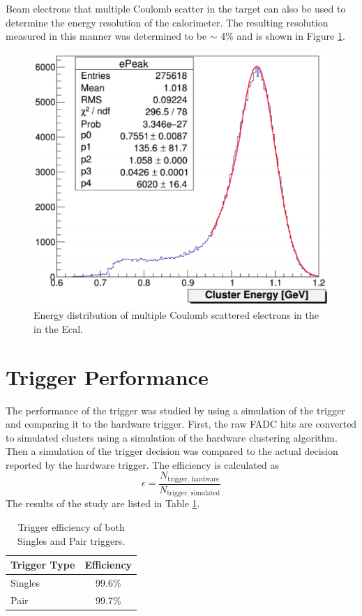 Beam electrons that multiple Coulomb scatter in the target can also be used to 
determine the energy resolution of the calorimeter.  The resulting resolution 
measured in this manner was determined to be $\sim$ 4\% and is shown in Figure
\ref{fig:energy_res}.
\begin{figure}[h!t]
    \centering
    \includegraphics[width=.7\textwidth]{images/ecal_energy_resolution.png}
    \caption{Energy distribution of multiple Coulomb scattered electrons in the
             in the Ecal.}
    \label{fig:energy_res}
\end{figure} 

\section{Trigger Performance}

The performance of the trigger was studied by using a simulation of the trigger
and comparing it to the hardware trigger.  First, the raw FADC hits are converted
to simulated clusters using a simulation of the hardware clustering algorithm. Then
a simulation of the trigger decision was compared to the actual decision reported
by the hardware trigger.  The efficiency is calculated as 
\begin{equation}
\epsilon = \frac{N_{\text{trigger, hardware}}}{N_{\text{trigger, simulated}}}
\end{equation}
The results of the study are listed in Table 
\ref{tab:trig_eff}.
\begin{table}[h!]
    \centering
    \begin{tabular}{lc}
        \toprule
        \textbf{Trigger Type} & \textbf{Efficiency} \\
        \midrule
        \midrule
        Singles               & 99.6\%              \\
        Pair                  & 99.7\%              \\
        \bottomrule
    \end{tabular}
    \caption{Trigger efficiency of both Singles and Pair triggers.}
    \label{tab:trig_eff}
\end{table}



